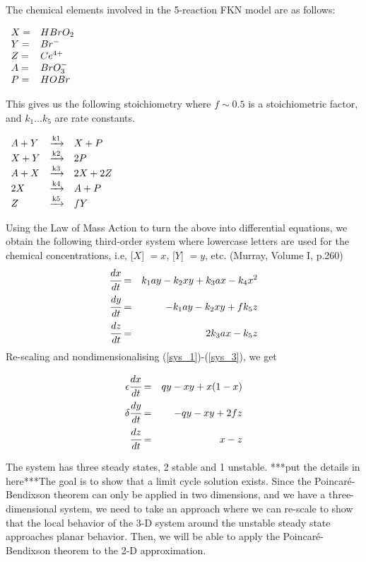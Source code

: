 \documentclass[]{article}
\numberwithin{equation}{section}		%
\def\bea{\begin{eqnarray}}
\def\ena{\end{eqnarray}}
\begin{document}
The chemical elements involved in the 5-reaction FKN model are as follows:

\begin{center}
$\begin{array}{l l}
X = & H Br O_2 \\
Y = & Br^- \\
Z = & Ce^{4+} \\
A = & BrO_3^- \\
P = & HOBr
\end{array} $
\end{center}


This gives us the following stoichiometry where $f \sim 0.5$ is a stoichiometric factor, and $k_{1} \ldots k_{5}$ are rate constants.

\begin{center}
$\begin{array}{l c l}
A + Y & \xrightarrow{\text{k1}} & X + P \\
X + Y & \xrightarrow{\text{k2}} & 2P \\
A + X & \xrightarrow{\text{k3}} & 2X + 2Z \\
2X & \xrightarrow{\text{k4}} & A + P \\
Z & \xrightarrow{\text{k5}}& fY
\end{array} $
\end{center}

Using the Law of Mass Action to turn the above into differential equations, we obtain the following third-order system where lowercase letters are used for the chemical concentrations, i.e, [$X$] $=x$, [$Y$] $=y$, etc. (Murray, Volume I, p.260)  
\bea
\label{sys_1}
\cfrac{dx}{dt} & = & k_1 ay - k_2 xy + k_3 ax - k_4 x^2\\
\label{sys_2}
\cfrac{dy}{dt} & = & -k_1 ay - k_2 xy + f k_5 z \\
\label{sys_3}
\cfrac{dz}{dt} & = & 2k_3 ax - k_5 z
\ena
Re-scaling and nondimensionalising (\ref{sys_1})-(\ref{sys_3}), we get

\bea
\label{e_dx}
\epsilon \cfrac{dx}{dt} & = & qy - xy + x(1-x) \\
\label{d_dy}
\delta \cfrac{dy}{dt} & = & -qy - xy + 2f z \\
\label{1_dz}
\cfrac{dz}{dt} & = & x - z
\ena


\indent The system has three steady states, 2 stable and 1 unstable. ***put the details in here***The goal is to show that a limit cycle solution exists. Since the Poincar\'{e}-Bendixson theorem can only be applied in two dimensions, and we have a three-dimensional system, we need to take an approach where we can re-scale to show that the local behavior of the 3-D system around the unstable steady state approaches planar behavior. Then, we will be able to apply the Poincar\'{e}-Bendixson theorem to the 2-D approximation.
\end{document}
